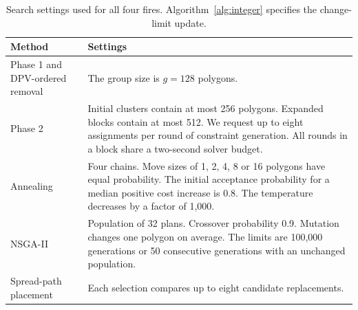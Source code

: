 \begin{table}[!tb]
\centering\small
\caption{Search settings used for all four fires. Algorithm~\ref{alg:integer} specifies the change-limit update.}
\label{tab:settings}
\begin{tabularx}{\textwidth}{lX}
\toprule
Method & Settings\\
\midrule
Phase 1 and DPV-ordered removal & The group size is $g=128$ polygons.\\
Phase 2 & Initial clusters contain at most 256 polygons. Expanded blocks contain at most 512. We request up to eight assignments per round of constraint generation. All rounds in a block share a two-second solver budget.\\
Annealing & Four chains. Move sizes of 1, 2, 4, 8 or 16 polygons have equal probability. The initial acceptance probability for a median positive cost increase is 0.8. The temperature decreases by a factor of 1,000.\\
NSGA-II & Population of 32 plans. Crossover probability 0.9. Mutation changes one polygon on average. The limits are 100,000 generations or 50 consecutive generations with an unchanged population.\\
Spread-path placement & Each selection compares up to eight candidate replacements.\\
\bottomrule
\end{tabularx}
\end{table}
